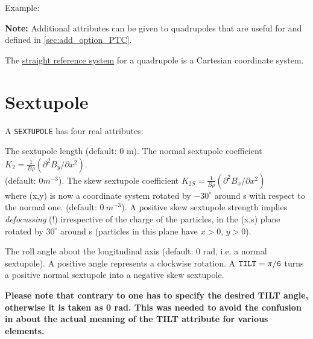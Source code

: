 Example: 

{\bf Note:} Additional attributes can be given to quadrupoles that
are useful for \ptc and defined in \ref{sec:add_option_PTC}.

The \hyperref[subsec:local_straight]{straight reference system} for
a quadrupole is a Cartesian coordinate system.


\section{Sextupole}
\label{sec:sextupole}


A {\tt SEXTUPOLE} has four real attributes: 
\begin{madlist}
     The sextupole length (default: 0 m). 
     The normal sextupole coefficient $K_2 = \frac{1}{B \rho}
      (\partial^2 B_y / \partial x^2)$. \\       
      (default: $0 m^{-3}$). 
     The skew sextupole coefficient 
      $K_{2S} = \frac{1}{B \rho} (\partial^2 B_x / \partial x^2)$ \\
      where (x,y) is now a coordinate system rotated by $-30^\circ$ around s with
      respect to the normal one. (default: $0\ m^{-3}$). A positive skew
      sextupole strength implies {\sl defocussing} (!) 
      irrespective of the charge of the particles,
      in the (x,s) plane rotated by $30^\circ$ around s (particles in
      this plane have $x > 0$, $y > 0$).  

     The roll angle about the longitudinal axis (default: 0
      rad, i.e. a normal sextupole). A positive angle represents a
      clockwise rotation. A $\tt{TILT} = \pi/6$ turns a positive normal 
      sextupole into a negative skew sextupole.
      
      \textbf{  Please note that contrary to \madeight one has to specify the
        desired TILT angle, otherwise it is taken as 0 rad. This was needed to
        avoid the confusion in \madeight about the actual meaning of the TILT
        attribute for various elements. } 
\end{madlist}

